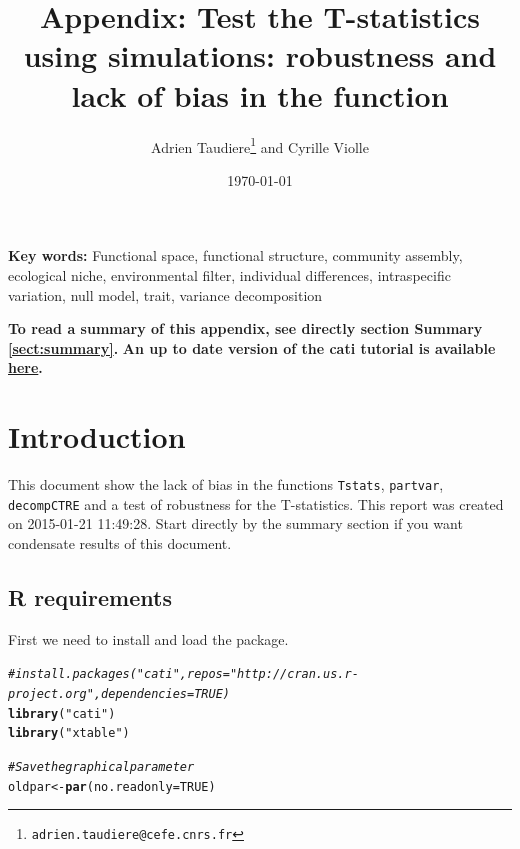 \documentclass[12pt]{article}\usepackage[]{graphicx}\usepackage[]{color}
\title{Appendix: Test the T-statistics using simulations: robustness and lack of bias in the function}
\author{Adrien Taudiere\thanks{\texttt{adrien.taudiere@cefe.cnrs.fr}} and Cyrille Violle}
\affil{{\footnotesize CEFE - Centre d'Ecologie Fonctionnelle et Evolutive, Montpellier: France}}
\date{\today}
\makeatletter
\newcommand{\hlnum}[1]{\textcolor[rgb]{0.686,0.059,0.569}{#1}}%
\newcommand{\hlstr}[1]{\textcolor[rgb]{0.192,0.494,0.8}{#1}}%
\newcommand{\hlcom}[1]{\textcolor[rgb]{0.678,0.584,0.686}{\textit{#1}}}%
\newcommand{\hlstd}[1]{\textcolor[rgb]{0.345,0.345,0.345}{#1}}%
\newcommand{\hlkwb}[1]{\textcolor[rgb]{0.69,0.353,0.396}{#1}}%
\newcommand{\hlkwc}[1]{\textcolor[rgb]{0.333,0.667,0.333}{#1}}%
\newcommand{\hlkwd}[1]{\textcolor[rgb]{0.737,0.353,0.396}{\textbf{#1}}}%
\newenvironment{kframe}{%
 \def\at@end@of@kframe{}%
 \ifinner\ifhmode%
  \def\at@end@of@kframe{\end{minipage}}%
  \begin{minipage}{\columnwidth}%
 \fi\fi%
 \def\FrameCommand##1{\hskip\@totalleftmargin \hskip-\fboxsep
 \colorbox{shadecolor}{##1}\hskip-\fboxsep
     \hskip-\linewidth \hskip-\@totalleftmargin \hskip\columnwidth}%
 \MakeFramed {\advance\hsize-\width
   \@totalleftmargin\z@ \linewidth\hsize
   \@setminipage}}%
 {\par\unskip\endMakeFramed%
 \at@end@of@kframe}
\newenvironment{knitrout}{}{} %
\makeatother
\begin{document}




\maketitle

\begin{abstract}

\end{abstract}


\textbf{Key words:}
Functional space, functional structure, community assembly, ecological niche, environmental filter,
individual differences, intraspecific variation, null model, trait, variance decomposition


\vfill
\begin{center}
\textbf{To read a summary of this appendix, see directly section Summary \ref{sect:summary}.}
\textbf{An up to date version of the cati tutorial is available \href{http://sourceforge.net/p/cati-r/code/ci/master/tree/tutorial/vignettes/vignette.pdf}{here}.}
\end{center}

\newpage
\tableofcontents
\newpage


\section{Introduction}
 This document show the lack of bias in the functions \texttt{Tstats}, \texttt{partvar}, \texttt{decompCTRE} and a test of robustness for the T-statistics.
This report was created on 2015-01-21 11:49:28. Start directly by the summary section if you want condensate results of this document.

\subsection{R requirements}

First we need to install and load the package. 
\begin{knitrout}\small
{}\color{fgcolor}\begin{kframe}
\begin{alltt}
\hlcom{# install.packages("cati", repos = "http://cran.us.r-project.org", dependencies = TRUE)}
\hlkwd{library}\hlstd{(}\hlstr{"cati"}\hlstd{)}
\hlkwd{library}\hlstd{(}\hlstr{"xtable"}\hlstd{)}

\hlcom{# Save the graphical parameter}
\hlstd{oldpar} \hlkwb{<-} \hlkwd{par}\hlstd{(}\hlkwc{no.readonly} \hlstd{=} \hlnum{TRUE}\hlstd{)}
\end{alltt}
\end{kframe}
\end{knitrout}
\end{document}
